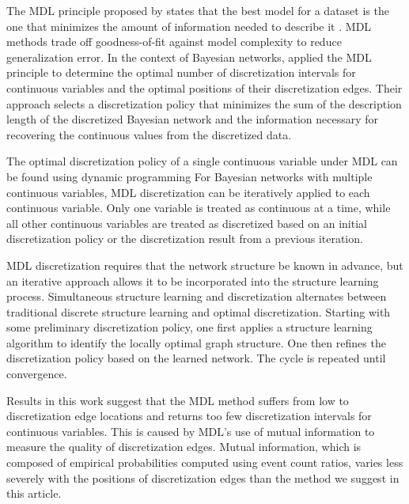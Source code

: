 The MDL principle proposed by \cite{MDL_1978} states that the best model for a dataset is the one that minimizes the amount of information needed to describe it \citep{Grunwald_2009}.
MDL methods trade off goodness-of-fit against model complexity to reduce generalization error.
In the context of Bayesian networks, \cite{Friedman_1996} applied the MDL principle to determine the optimal number of discretization intervals for continuous variables and the optimal positions of their discretization edges.
Their approach selects a discretization policy that minimizes the sum of the description length of the discretized Bayesian network and the information necessary for recovering the continuous values from the discretized data.

The optimal discretization policy of a single continuous variable under MDL can be found using dynamic programming 
For Bayesian networks with multiple continuous variables, MDL discretization can be iteratively applied to each continuous variable.
Only one variable is treated as continuous at a time, while all other continuous variables are treated as discretized based on an initial discretization policy or the discretization result from a previous iteration.

MDL discretization requires that the network structure be known in advance, but an iterative approach allows it to be incorporated into the structure learning process.
Simultaneous structure learning and discretization alternates between traditional discrete structure learning and optimal discretization.
Starting with some preliminary discretization policy, one first applies a structure learning algorithm to identify the locally optimal graph structure.
One then refines the discretization policy based on the learned network.
The cycle is repeated until convergence.

Results in this work suggest that the MDL method suffers from low  to discretization edge locations and returns too few discretization intervals for continuous variables.
This is caused by MDL's use of mutual information to measure the quality of discretization edges.
Mutual information, which is composed of empirical probabilities computed using event count ratios, varies less severely with the positions of discretization edges than the method we suggest in this article.

